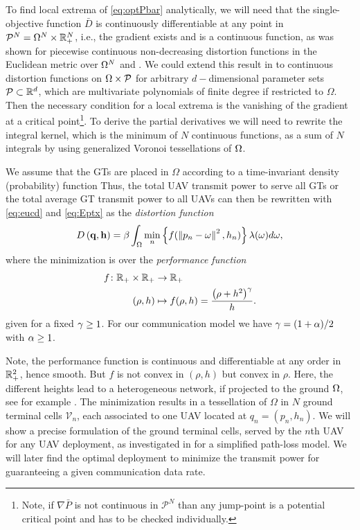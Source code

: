 \documentclass[smallabstract,smallcaptions]{dccpaper}
\newcommand{\disfunction}{distortion function}
\newcounter{example}[section]
\renewcommand{\vp}{\mathbf q}
\newcommand{\df}{\ensuremath{\lam}}         %
\newcommand{\bP}{\ensuremath{\vp}}          %
\newcommand{\bH}{\ensuremath{\vh}}          %
\newcommand{\Pbar}{\ensuremath{\bar{P}}}         %
\newcommand{\Vor}{\ensuremath{\mathcal{V}}}         %
\newcommand{\Qset}{\ensuremath{\mathcal P}}
\newcommand{\Dis}{\ensuremath{D}}                    %
\newcommand{\AvDis}{\ensuremath{\bar{\Dis}}}         %
\begin{document}
%

To find local extrema of \eqref{eq:optPbar} analytically, we will need that the single-objective function $\AvDis$ is
continuously differentiable at any point in $\Qset^N=\Omega^N\times \R_+^N$, i.e., the gradient exists and is a
continuous function, as was shown for piecewise continuous non-decreasing distortion functions in the Euclidean metric
over $\Omega^N$ \cite[Thm.2.2]{CMB05} and \cite{GJ}. We could extend this result in \cite{WJ18} to continuous
\disfunction s on $\Ome\times\Qset$ for arbitrary $d-$dimensional parameter sets $\Qset\subset \R^d$, which are
multivariate polynomials of finite degree if restricted to $\Omega$.  Then the necessary condition for a local extrema
is the vanishing of the gradient at a critical point\footnote{Note, if $\nabla \Pbar$ is not continuous in $\Qset^N$
than any jump-point is a potential critical point and has to be checked individually.}.  To derive the partial
derivatives we will need to rewrite the integral kernel, which is the minimum of $N$ continuous functions, as a sum of
$N$ integrals by using  generalized Voronoi tessellations of $\Omega$.
%





We assume that the GTs  are placed in $\Omega$ according to a time-invariant density (probability) function
  Thus, the total
UAV transmit power to serve all GTs or the total average GT transmit power to all UAVs can then be rewritten with
\eqref{eq:eucd} and \eqref{eq:Eptx} as the \emph{distortion function}
%
\begin{equation}
  D\left(\bP,\bH\right)=\bet\int_{\Omega}\min_{n} \left\{ f(\Norm{p_n-\ome}^2,h_n) \right\} \df(\omega)d\omega,
 \label{obj0}
\end{equation}
%
where the minimization is over the \emph{performance function}
%
\begin{align}
 f \colon {\ensuremath{\mathbb R}}_+\times {\ensuremath{\mathbb R}}_+ &\to {\ensuremath{\mathbb R}}_+\\
           (\rho,h)&\mapsto f(\rho,h)=\frac{\left(\rho+h^2\right)^{\gamma}}{h}.
\end{align}
%
given for a fixed $\gamma\geq 1$. For our communication model we have $\gamma=(1+\alpha)/2$ with $\alpha\geq 1$.

Note, the performance function is continuous and differentiable at any order in ${\mathbb R}^2_+$, hence smooth. But $f$ is not
convex in $(\rho,h)$ but convex in $\rho$. 
Here, the different heights lead to a heterogeneous network, if projected to the ground $\Omega$, see for example
\cite{GJ16a}.  The minimization results in a tessellation of $\Omega$ in $N$ ground terminal cells $\Vor_n$, each
associated to one UAV located at $q_n=(p_n,h_n)$.  We will show a precise formulation of the ground terminal cells,
served by the $n$th UAV for any UAV deployment, as investigated in \cite{MSBD16b} for a simplified path-loss model. We
will later find the optimal deployment to minimize the transmit power for guaranteeing a given communication data rate.
%
\fi
\end{document}
